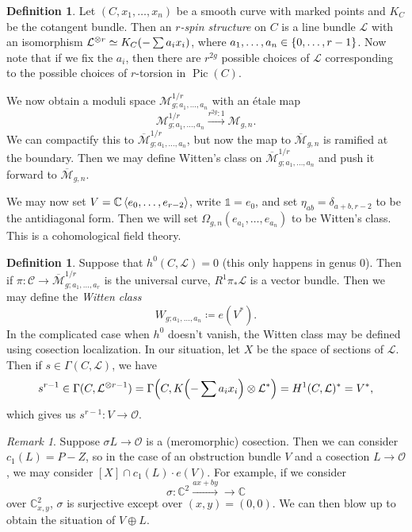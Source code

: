 \documentclass[leqno, openany]{memoir}
\theoremstyle{definition}
\newtheorem{defn}[thm]{Definition}
\theoremstyle{remark}
\newtheorem{rmk}[thm]{Remark}
\theoremstyle{plain}
\theoremstyle{definition}
\theoremstyle{remark}
\newcommand{\C}{\mathbb{C}}
\newcommand{\mc}[1]{\mathcal{#1}}
\newcommand{\ol}[1]{\overline{#1}}
\DeclareMathOperator{\Pic}{Pic}
\begin{document}
\begin{defn}
Let $(C, x_1, \ldots, x_n)$ be a smooth curve with marked points and $K_C$ be the cotangent bundle. Then an \textit{$r$-spin structure} on $C$ is a line bundle $\mc{L}$ with an isomorphism $\mc{L}^{\otimes r} \simeq K_C\qty(-\sum a_i x_i)$, where $a_1, \ldots, a_n \in \qty{0, \ldots, r-1}$. Now note that if we fix the $a_i$, then there are $r^{2g}$ possible choices of $\mc{L}$ corresponding to the possible choices of $r$-torsion in $\Pic(C)$.
\end{defn}

We now obtain a moduli space $\mc{M}_{g;a_1,\ldots,a_n}^{1/r}$ with an \'etale map
\[ \mc{M}_{g;a_1,\ldots,a_n}^{1/r} \xrightarrow{r^{2g}:1} \mc{M}_{g,n}. \]
We can compactify this to $\ol{\mc{M}}_{g;a_1,\ldots,a_n}^{1/r}$, but now the map to $\ol{\mc{M}}_{g,n}$ is ramified at the boundary. Then we may define Witten's class on $\ol{\mc{M}}_{g;a_1,\ldots,a_n}^{1/r}$ and push it forward to $\ol{\mc{M}}_{g,n}$.

We may now set $V = \C\ev{e_0, \ldots, e_{r-2}}$, write $\mathbb{1} = e_0$, and set $\eta_{ab} = \delta_{a+b,r-2}$ to be the antidiagonal form. Then we will set $\Omega_{g,n}(e_{a_1}, \ldots, e_{a_n})$ to be Witten's class. This is a cohomological field theory.

\begin{defn}
  Suppose that $h^0(C, \mc{L}) = 0$ (this only happens in genus $0$). Then if $\pi \colon \mc{C} \to \ol{\mc{M}}_{g;a_1,\ldots,a_r}^{1/r}$ is the universal curve, $R^1 \pi_* \mc{L}$ is a vector bundle. Then we may define the \textit{Witten class}
  \[ W_{g;a_1,\ldots,a_n} \coloneqq e(V^*). \]
  In the complicated case when $h^0$ doesn't vanish, the Witten class may be defined using cosection localization. In our situation, let $X$ be the space of sections of $\mc{L}$. Then if $s \in \Gamma(C, \mc{L})$, we have
  \[ s^{r-1} \in \Gamma(C, \mc{L}^{\otimes r-1}) = \Gamma\qty(C, K\qty(-\sum a_i x_i) \otimes \mc{L}^*) = H^1(C, \mc{L})^* = V^*, \]
  which gives us $s^{r-1} \colon V \to \mc{O}$.
\end{defn}

\begin{rmk}
  Suppose $\sigma L \to \mc{O}$ is a (meromorphic) cosection. Then we can consider $c_1(L) = P-Z$, so in the case of an obstruction bundle $V$ and a cosection $L \to \mc{O}$, we may consider $[X] \cap c_1(L) \cdot e(V)$. For example, if we consider
  \[\sigma \colon \C^2 \xrightarrow{ax+by} \to \C \]
  over $\C^2_{x,y}$, $\sigma$ is surjective except over $(x,y) = (0,0)$. We can then blow up to obtain the situation of $V \oplus L$.
\end{rmk}
\end{document}
